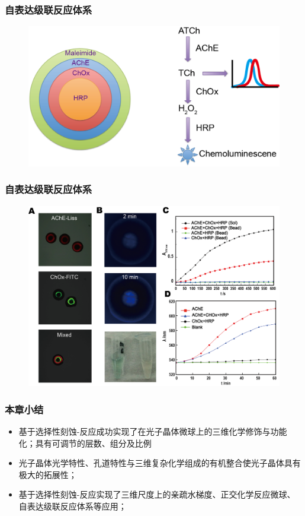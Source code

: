 \documentclass{beamer}
\begin{document}
\begin{frame}
  \frametitle{自表达级联反应体系}
  \begin{figure}
    \begin{center}
      \includegraphics[width=0.8\linewidth]{figures/ch3/cascade.png}
    \end{center}
  \end{figure}
\end{frame}
\begin{frame}
  \frametitle{自表达级联反应体系}
  \begin{figure}
    \begin{center}
      \includegraphics[width=0.85\linewidth]{figures/ch3/cascade-res.png}
    \end{center}
  \end{figure}
\end{frame}

\begin{frame}
  \frametitle{本章小结}
  \begin{itemize}
    \item
    基于选择性刻蚀-反应成功实现了在光子晶体微球上的三维化学修饰与功能化；具有可调节的层数、组分及比例
    \item
    光子晶体光学特性、孔道特性与三维复杂化学组成的有机整合使光子晶体具有极大的拓展性；
    \item
    基于选择性刻蚀-反应实现了三维尺度上的亲疏水梯度、正交化学反应微球、自表达级联反应体系等应用；
  \end{itemize}
\end{frame}
\end{document}

